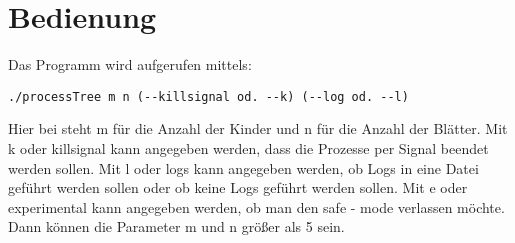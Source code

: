 \documentclass{article}
\begin{document}
\section{Bedienung}
Das Programm wird aufgerufen mittels:
\begin{verbatim}
./processTree m n (--killsignal od. --k) (--log od. --l)
\end{verbatim} 
Hier bei steht m für die Anzahl der Kinder und n für die Anzahl der Blätter.
\newline
\newline
Mit \verb --k  oder \verb --killsignal  kann angegeben werden, dass die Prozesse per Signal beendet werden sollen. \newline \newline
Mit \verb --l  oder \verb --logs  kann angegeben werden, ob Logs in eine Datei geführt werden sollen oder ob keine Logs geführt werden sollen. \newline \newline
Mit \verb --e  oder \verb --experimental  kann angegeben werden, ob man den safe - mode verlassen möchte. Dann können die Parameter m und n größer als 5 sein.
\end{document}
